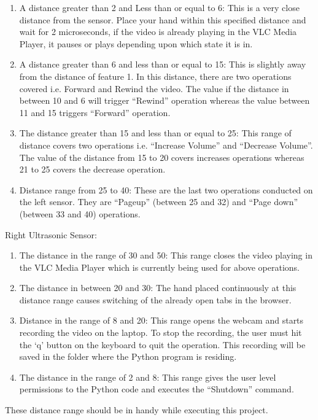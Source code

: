 \documentclass[12pt,journal]{IEEEtran}
\begin{document}
\begin{enumerate}
  \item A distance greater than 2 and Less than or equal to 6: This is a very close distance from the sensor. Place your hand within this specified distance and wait for 2 microseconds, if the video is already playing in the VLC Media Player, it pauses or plays depending upon which state it is in.
  \bigskip
  \item A distance greater than 6 and less than or equal to 15: This is slightly away from the distance of feature 1. In this distance, there are two operations covered i.e. Forward and Rewind the video. The value if the distance in between 10 and 6 will trigger “Rewind” operation whereas the value between 11 and 15 triggers “Forward” operation.
  \bigskip
  \item The distance greater than 15 and less than or equal to 25: This range of distance covers two operations i.e. “Increase Volume” and “Decrease Volume”.  The value of the distance from 15 to 20 covers increases operations whereas 21 to 25 covers the decrease operation.
  \bigskip
  \item Distance range from 25 to 40: These are the last two operations conducted on the left sensor. They are “Pageup” (between 25 and 32) and “Page down” (between 33 and 40) operations. 
\end{enumerate}
\bigskip
\par Right Ultrasonic Sensor:
 \bigskip
\begin{enumerate}
  \item The distance in the range of 30 and 50: This range closes the video playing in the VLC Media Player which is currently being used for above operations.
  \bigskip
  \item The distance in between 20 and 30: The hand placed continuously at this distance range causes switching of the already open tabs in the browser.
 \bigskip
  \item Distance in the range of 8 and 20: This range opens the webcam and starts recording the video on the laptop. To stop the recording, the user must hit the ‘q’ button on the keyboard to quit the operation. This recording will be saved in the folder where the Python program is residing.
  \bigskip
  \item The distance in the range of 2 and 8: This range gives the user level permissions to the Python code and executes the “Shutdown” command. 
\end{enumerate}
\bigskip
These distance range should be in handy while executing this project.
\end{document}
